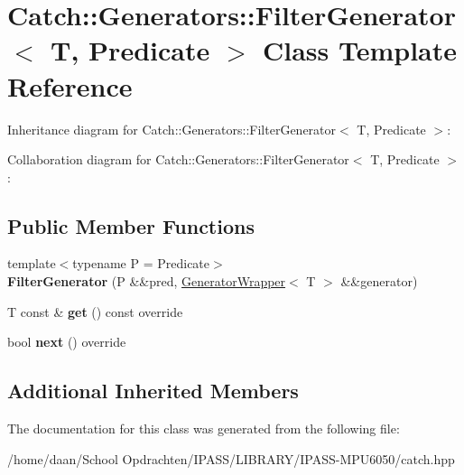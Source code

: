 \hypertarget{classCatch_1_1Generators_1_1FilterGenerator}{}\section{Catch\+:\+:Generators\+:\+:Filter\+Generator$<$ T, Predicate $>$ Class Template Reference}
\label{classCatch_1_1Generators_1_1FilterGenerator}


Inheritance diagram for Catch\+:\+:Generators\+:\+:Filter\+Generator$<$ T, Predicate $>$\+:


Collaboration diagram for Catch\+:\+:Generators\+:\+:Filter\+Generator$<$ T, Predicate $>$\+:
\subsection*{Public Member Functions}
\begin{DoxyCompactItemize}
\item 
\mbox{\label{classCatch_1_1Generators_1_1FilterGenerator_aa16886a5e41cbd3b6ffa3dd52388a3a1}} 
{\footnotesize template$<$typename P  = Predicate$>$ }\\{\bfseries Filter\+Generator} (P \&\&pred, \hyperlink{classCatch_1_1Generators_1_1GeneratorWrapper}{Generator\+Wrapper}$<$ T $>$ \&\&generator)
\item 
\mbox{\label{classCatch_1_1Generators_1_1FilterGenerator_ab30e81b61a77430661d40f814758f6fe}} 
T const  \& {\bfseries get} () const override
\item 
\mbox{\label{classCatch_1_1Generators_1_1FilterGenerator_a02ce0839dcaa7545c55d0fe70cc50e84}} 
bool {\bfseries next} () override
\end{DoxyCompactItemize}
\subsection*{Additional Inherited Members}


The documentation for this class was generated from the following file\+:\begin{DoxyCompactItemize}
\item 
/home/daan/\+School Opdrachten/\+I\+P\+A\+S\+S/\+L\+I\+B\+R\+A\+R\+Y/\+I\+P\+A\+S\+S-\/\+M\+P\+U6050/catch.\+hpp\end{DoxyCompactItemize}
